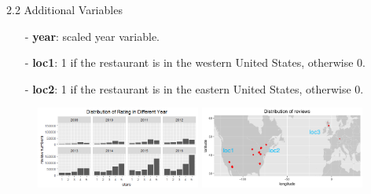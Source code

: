 \documentclass[10pt]{beamer}
\begin{document}
\begin{frame}{2.2 Additional Variables}

\begin{itemize}
	\item[-] \textbf{year}: scaled year variable.
	
	\item[-] \textbf{loc1}: 1 if the restaurant is in the western United States, otherwise 0.
	
	\item[-] \textbf{loc2}: 1 if the restaurant is in the eastern United States, otherwise 0.
	
\end{itemize}


\begin{figure}[htbp]
\centering
\begin{minipage}[t]{0.5\textwidth}
\centering
\includegraphics[width=5.4cm,height=2.7cm]{../image/year.png}

\end{minipage}
\begin{minipage}[t]{0.48\textwidth}
\centering
\includegraphics[width=5.4cm,height=2.7cm]{../image/worldmap.png}

\end{minipage}
\end{figure}

\end{frame}
\end{document}
